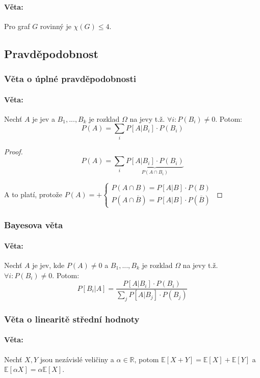 \documentclass[10pt,a4paper]{article}
\newcommand{\R}{{\mathbb{R}}}
\newcommand{\E}{{\mathbb{E}}}
\begin{document}
\paragraph*{Věta: } Pro graf $G$ rovinný je $\chi (G) \leq 4$.

\subsection{Pravděpodobnost}

\subsubsection{Věta o úplné pravděpodobnosti}

\paragraph*{Věta: } Nechť $A$ je jev a $B_1, ..., B_k$ je rozklad $\Omega$ na jevy t.ž. $\forall i: P(B_i) \neq 0$. Potom:
\[
  P(A) = \sum_{i} P[A|B_i] \cdot P(B_i)
\]
\begin{proof}
    \[
  P(A) = \sum_{i} \underbrace{P[A|B_i] \cdot P(B_i)}_{P(A\cap B_i)}
    \]

    A to platí, protože $P(A) = +\begin{cases}
        P(A\cap B)=P[A|B]\cdot P(B)\\
        P(A\cap \overline{B})=P[A|B]\cdot P(\overline{B})
    \end{cases}$
\end{proof}

\subsubsection{Bayesova věta}
\paragraph*{Věta: } Nechť $A$ je jev, kde $P(A) \neq 0$ a $B_1, ..., B_k$ je rozklad $\Omega$ na jevy t.ž. $\forall i: P(B_i) \neq 0$. Potom:
\[
    P[B_i|A] = \frac{P[A|B_i] \cdot P(B_i)}{\displaystyle \sum_{j} P[A|B_j] \cdot P(B_j)}
\]

\subsubsection{Věta o linearitě střední hodnoty}
\paragraph*{Věta: } Nechť $X,Y$ jsou nezávislé veličiny a $\alpha \in \R$, potom $\E [X+Y] = \E [X] + \E [Y]$ a $\E [\alpha X] = \alpha \E [X]$.
\end{document}

